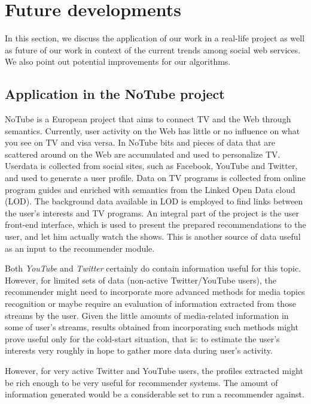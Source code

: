 \section{Future developments}

In this section, we discuss the application of our work in a real-life project
as well as future of our work in context of the current
trends among social web services. We also point out potential improvements for
our algorithms.

\subsection{Application in the NoTube project}

NoTube is a European project that aims to connect TV and the Web through
semantics. Currently, user activity on the Web has little or no influence on
what you see on TV and visa versa. In NoTube bits and pieces of data that are
scattered around on the Web are accumulated and used to personalize TV. Userdata
is collected from social sites, such as Facebook, YouTube and Twitter, and used
to generate a user profile. Data on TV programs is collected from online program
guides and enriched with semantics from the Linked Open Data cloud (LOD). The
background data available in LOD is employed to find links between the user's
interests and TV programs. An integral part of the project is the user front-end
interface, which is used to present the prepared recommendations to the user,
and let him actually watch the shows. This is another source of data useful as
an input to the recommender module.

Both \textit{YouTube} and \textit{Twitter} certainly do contain information
useful for this topic. However, for limited sets of data (non-active
Twitter/YouTube users), the recommender might need to incorporate more advanced methods
for media topics recognition or maybe require an evaluation of information extracted
from those streams by the user. Given the little amounts of media-related information
in some of user's streams, results obtained from incorporating such methods might
prove useful only for the cold-start situation, that is: to estimate the user's interests
very roughly in hope to gather more data during user's activity.

However, for very active Twitter and YouTube users, the profiles extracted
might be rich enough to be very useful for recommender systems. The amount of
information generated would be a considerable set to run a recommender against.

